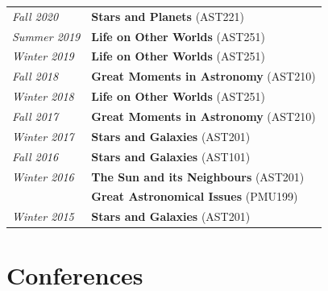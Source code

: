 \documentclass[10pt]{res} %
\begin{document}
\begin{resume}
\begin{table}[h!]
\begin{tabularx}{\textwidth}{lX}
\textit{Fall 2020}      & \textbf{Stars and Planets} (AST221) \\

\textit{Summer 2019} & \textbf{Life on Other Worlds} (AST251) \\
\textit{Winter 2019} & \textbf{Life on Other Worlds} (AST251) \\
\textit{Fall 2018}      & \textbf{Great Moments in Astronomy} (AST210) \\
\textit{Winter 2018} & \textbf{Life on Other Worlds} (AST251) \\
\textit{Fall 2017}      & \textbf{Great Moments in Astronomy} (AST210) \\
\textit{Winter 2017} & \textbf{Stars and Galaxies} (AST201) \\
\textit{Fall 2016} & \textbf{Stars and Galaxies} (AST101) \\
\textit{Winter 2016}  & \textbf{The Sun and its Neighbours} (AST201) \\
                                & \textbf{Great Astronomical Issues} (PMU199) \\
\textit{Winter 2015} & \textbf{Stars and Galaxies} (AST201)
\end{tabularx}
\end{table}


\newpage
\section{\Large Conferences}
\vspace{-5pt} %
\noindent\makebox[\linewidth]{\rule{\textwidth}{0.4pt}}
\vspace{-20pt} %


\end{resume}
\end{document}
